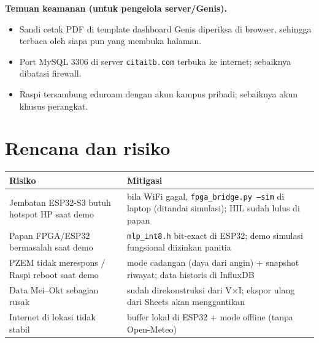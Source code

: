 \documentclass[10.5pt,a4paper]{article}
\newcommand{\cmd}[1]{\texttt{#1}}
\begin{document}
\textbf{Temuan keamanan (untuk pengelola server/Genis).}
\begin{itemize}
  \item Sandi cetak PDF di template dashboard Genis diperiksa di browser, sehingga terbaca oleh siapa pun yang membuka halaman.
  \item Port MySQL 3306 di server \cmd{citaitb.com} terbuka ke internet; sebaiknya dibatasi firewall.
  \item Raspi tersambung eduroam dengan akun kampus pribadi; sebaiknya akun khusus perangkat.
\end{itemize}

\section{Rencana dan risiko}
\begin{center}
\end{center}
\begin{center}
\small
\begin{tabularx}{\linewidth}{@{}X X@{}}
\toprule
Risiko & Mitigasi \\
\midrule
Jembatan ESP32-S3 butuh hotspot HP saat demo & bila WiFi gagal, \cmd{fpga\_bridge.py --sim} di laptop (ditandai simulasi); HIL sudah lulus di papan \\
Papan FPGA/ESP32 bermasalah saat demo & \cmd{mlp\_int8.h} bit-exact di ESP32; demo simulasi fungsional diizinkan panitia \\
PZEM tidak merespons / Raspi reboot saat demo & mode cadangan (daya dari angin) + snapshot riwayat; data historis di InfluxDB \\
Data Mei--Okt sebagian rusak & sudah direkonstruksi dari V$\times$I; ekspor ulang dari Sheets akan menggantikan \\
Internet di lokasi tidak stabil & buffer lokal di ESP32 + mode offline (tanpa Open-Meteo) \\
\bottomrule
\end{tabularx}
\end{center}
\end{document}
